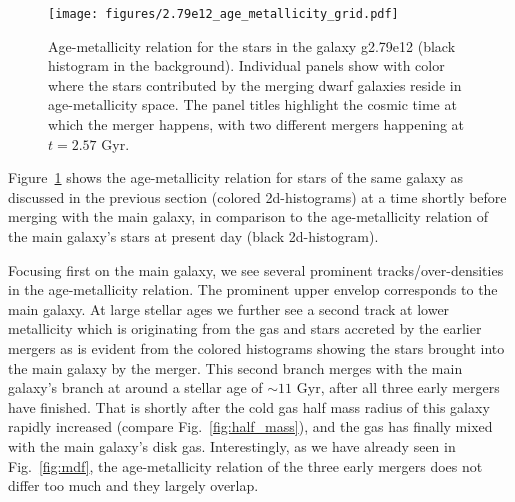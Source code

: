 \documentclass[useAMS,usenatbib]{mnras}
\begin{document}
\begin{figure}
    \begin{centering}
        \texttt{[image: figures/2.79e12\_age\_metallicity\_grid.pdf]}
        \vspace*{-1.75em}
        \caption{
            Age-metallicity relation for the stars in the galaxy g2.79e12 (black histogram in the background). Individual panels show with color where the stars contributed by the merging dwarf galaxies reside in age-metallicity space. The panel titles highlight the cosmic time at which the merger happens, with two different mergers happening at $t = 2.57$ Gyr.
        }
        \label{fig:age_feh}
    \end{centering}
\end{figure}

Figure~\ref{fig:age_feh} shows the age-metallicity relation for stars of the same galaxy as discussed in the previous section (colored 2d-histograms) at a time shortly before merging with the main galaxy, in comparison to the age-metallicity relation of the main galaxy's stars at present day (black 2d-histogram).

Focusing first on the main galaxy, we see several prominent tracks/over-densities in the age-metallicity relation. The prominent upper envelop corresponds to the main galaxy. At large stellar ages we further see a second track at lower metallicity which is originating from the gas and stars accreted by the earlier mergers as is evident from the colored histograms showing the stars brought into the main galaxy by the merger. This second branch merges with the main galaxy's branch at around a stellar age of $\sim11$ Gyr, after all three early mergers have finished. That is shortly after the cold gas half mass radius of this galaxy rapidly increased (compare Fig.~\ref{fig:half_mass}), and the gas has finally mixed with the main galaxy's disk gas. Interestingly, as we have already seen in Fig.~\ref{fig:mdf}, the age-metallicity relation of the three early mergers does not differ too much and they largely overlap.
\end{document}
